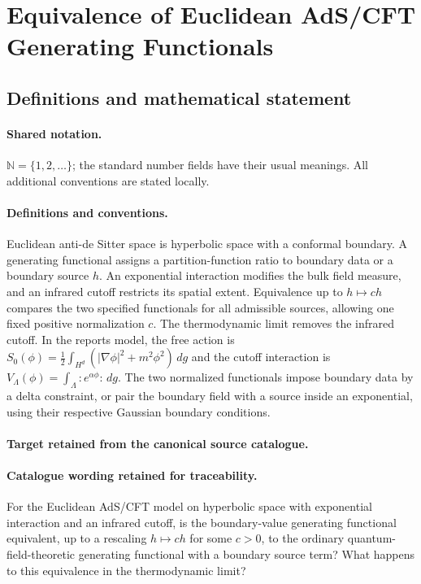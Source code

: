 \documentclass[11pt]{article}
\begin{document}
\section{Equivalence of Euclidean AdS/CFT Generating Functionals}\label{statement}

\subsection{Definitions and mathematical statement}

\paragraph{Shared notation.}$\mathbb N=\{1,2,\ldots\}$; the standard number fields have their usual meanings. All additional conventions are stated locally.


\paragraph{Definitions and conventions.}
Euclidean anti-de Sitter space is hyperbolic space with a conformal boundary. A generating functional assigns a partition-function ratio to boundary data or a boundary source $h$. An exponential interaction modifies the bulk field measure, and an infrared cutoff restricts its spatial extent. Equivalence up to $h\mapsto ch$ compares the two specified functionals for all admissible sources, allowing one fixed positive normalization $c$. The thermodynamic limit removes the infrared cutoff. In the report\textquotesingle s model, the free action is $S_0(\phi)=\frac12\int_{H^d}(|\nabla\phi|^2+m^2\phi^2)\,dg$ and the cutoff interaction is $V_\Lambda(\phi)=\int_\Lambda:\!e^{\alpha\phi}\!:\,dg$. The two normalized functionals impose boundary data by a delta constraint, or pair the boundary field with a source inside an exponential, using their respective Gaussian boundary conditions.

\paragraph{Target retained from the canonical source catalogue.}
\paragraph{Catalogue wording retained for traceability.}
For the Euclidean AdS/CFT model on hyperbolic space with exponential interaction and an infrared cutoff, is the boundary-value generating functional equivalent, up to a rescaling $h\mapsto ch$ for some $c>0$, to the ordinary quantum-field-theoretic generating functional with a boundary source term? What happens to this equivalence in the thermodynamic limit?
\end{document}
